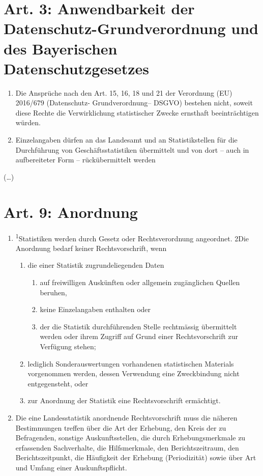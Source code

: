 \documentclass[A4, 12pt]{scrbook}
\begin{document}
    \section[Art. 3: EU-DSGVO und BayDatSchG]{Art. 3: Anwendbarkeit der Datenschutz-Grundverordnung und des Bayerischen Datenschutzgesetzes}
        \begin{enumerate}[label=(\arabic*)]
            \item Die Ansprüche nach den Art. 15, 16, 18 und 21 der Verordnung (EU) 2016/679 (Datenschutz- Grundverordnung– DSGVO) bestehen nicht, soweit diese Rechte die Verwirklichung statistischer Zwecke ernsthaft beeinträchtigen würden.
            \item Einzelangaben dürfen an das Landesamt und an Statistikstellen für die Durch\-füh\-rung von Geschäftsstatistiken übermittelt und von dort – auch in aufbereiteter Form – rückübermittelt werden
        \end{enumerate}
    (\dots)
    \section{Art. 9: Anordnung}
        \begin{enumerate}[label=(\arabic*)]
            \item \textsuperscript{1}Statistiken werden durch Gesetz oder Rechtsverordnung angeordnet. 2Die Anordnung bedarf keiner Rechtsvorschrift, wenn
            \begin{enumerate}[label=\arabic*.]
                \item die einer Statistik zugrundeliegenden Daten
                    \begin{enumerate}[label=(\alph*)]
                        \item auf freiwilligen Auskünften oder allgemein zugänglichen Quellen beruhen,
                        \item keine Einzelangaben enthalten oder
                        \item der die Statistik durchführenden Stelle rechtmässig übermittelt werden oder ihrem Zugriff auf Grund einer Rechtsvorschrift zur Verfügung stehen;
                    \end{enumerate}
                \item lediglich Sonderauswertungen vorhandenen statistischen Materials vorgenommen werden, dessen Verwendung eine Zweckbindung nicht entgegensteht, oder
                \item zur Anordnung der Statistik eine Rechtsvorschrift ermächtigt.
            \end{enumerate}
            \item Die eine Landesstatistik anordnende Rechtsvorschrift muss die näheren Bestimmungen treffen über die Art der Erhebung, den Kreis der zu Befragenden, sonstige Auskunftsstellen, die durch Erhebungsmerkmale zu erfassenden Sachverhalte, die Hilfsmerkmale, den Berichtszeitraum, den Berichtszeitpunkt, die Häufigkeit der Erhebung (Periodizität) sowie über Art und Umfang einer Auskunftspflicht.
        \end{enumerate}
\end{document}
